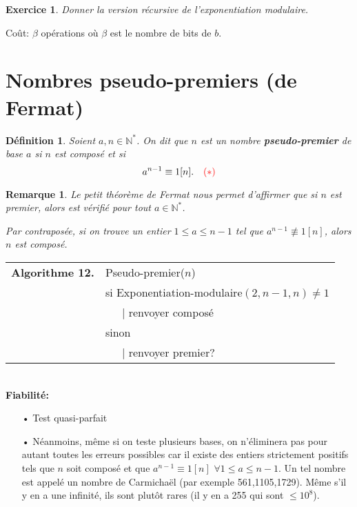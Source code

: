 \documentclass[12pt]{report}
\newtheorem*{exo}{Exercice}
\newtheorem*{rem}{Remarque}
\newtheorem{Def}[thm]{Définition}
\begin{document}
\begin{exo}
Donner la version récursive de l'exponentiation modulaire.
\end{exo}

Coût: $\beta$ opérations où $\beta$ est le nombre de bits de $b$.

\section{Nombres pseudo-premiers (de Fermat)}

\begin{Def}
Soient $a,n \in \mathbb{N}^*$. On dit que $n$ est un nombre \textbf{pseudo-premier} de base $a$ si $n$ est composé et si 
$$    a^{n-1} \equiv 1 [n]. \quad {\color{red}(*)}   $$ 
\end{Def}

\begin{rem}
Le petit théorème de Fermat nous permet d'affirmer que si $n$ est premier, alors \rge{$(*)$} est vérifié pour tout $a \in \mathbb{N}^*$. \par 
Par contraposée, si on trouve un entier $1 \leq a \leq n-1$ tel que $a^{n-1} \not \equiv 1 [n]$, alors $n$ est composé.
\end{rem}


\begin{tabular}{ll}
\textbf{Algorithme 12.} & Pseudo-premier($n$)\\
           & si Exponentiation-modulaire$(2,n-1,n)\neq 1$ \\
           & \ \ \ {\rm |} renvoyer composé \\
           & sinon  \\
           & \ \ \ {\rm |}  renvoyer premier? 
\end{tabular}\\

\textbf{Fiabilité:}\begin{itemize}
\item[•]Test quasi-parfait 
\item[•] Néanmoins, même si on teste plusieurs bases, on n'éliminera pas pour autant toutes les erreurs possibles car il existe des entiers strictement positifs tels que $n$ soit composé et que $a^{n-1} \equiv 1 [n]$ $\forall 1 \leq a \leq n-1$. Un tel nombre est appelé un nombre de Carmichaël (par exemple 561,1105,1729). Même s'il y en a une infinité, ils sont plutôt rares (il y en a 255 qui sont $\leq 10^8$).
\end{itemize}
\end{document}
